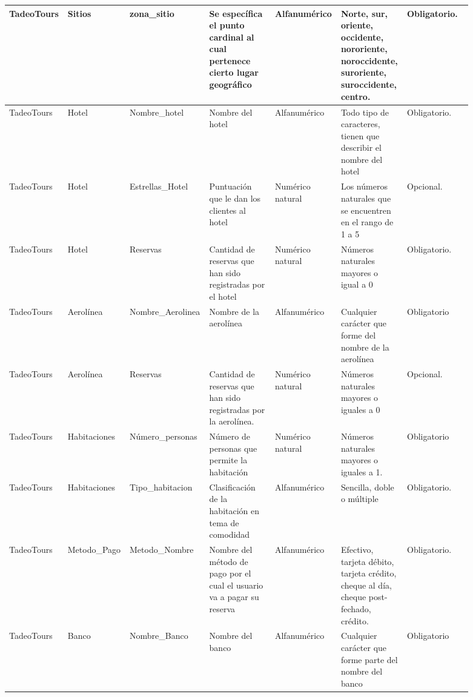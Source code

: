 \documentclass{article}
\begin{document}
\begin{landscape}
\begin{longtable}{|C{0.102\linewidth}|C{0.102\linewidth}|C{0.142\linewidth}|C{0.142\linewidth}|C{0.122\linewidth}|C{0.142\linewidth}|C{0.142\linewidth}|}
TadeoTours & Sitios & zona\_sitio & Se específica el punto cardinal al cual pertenece cierto lugar geográfico & Alfanumérico & Norte, sur, oriente, occidente, nororiente, noroccidente, suroriente, suroccidente, centro. & Obligatorio. \\ \hline

TadeoTours & Hotel & Nombre\_hotel & Nombre del hotel & Alfanumérico & Todo tipo de caracteres, tienen que describir el nombre del hotel & Obligatorio. \\ \hline

TadeoTours & Hotel & Estrellas\_Hotel & Puntuación que le dan los clientes al hotel & Numérico natural & Los números naturales que se encuentren en el rango de 1 a 5 & Opcional. \\ \hline

TadeoTours & Hotel & Reservas & Cantidad de reservas que han sido registradas por el hotel & Numérico natural & Números naturales mayores o igual a 0 & Obligatorio. \\ \hline

TadeoTours & Aerolínea & Nombre\_Aerolinea & Nombre de la aerolínea & Alfanumérico & Cualquier carácter que forme del nombre de la aerolínea & Obligatorio \\ \hline

TadeoTours & Aerolínea & Reservas & Cantidad de reservas que han sido registradas por la aerolínea. & Numérico natural & Números naturales mayores o iguales a 0 & Opcional. \\ \hline

TadeoTours & Habitaciones & Número\_personas & Número de personas que permite la habitación & Numérico natural & Números naturales mayores o iguales a 1. & Obligatorio \\ \hline

TadeoTours & Habitaciones & Tipo\_habitacion & Clasificación de la habitación en tema de comodidad & Alfanumérico & Sencilla, doble o múltiple & Obligatorio. \\ \hline

TadeoTours & Metodo\_Pago & Metodo\_Nombre & Nombre del método de pago por el cual el usuario va a pagar su reserva & Alfanumérico & Efectivo, tarjeta débito, tarjeta crédito, cheque al día, cheque post-fechado, crédito. & Obligatorio. \\ \hline

TadeoTours & Banco & Nombre\_Banco & Nombre del banco & Alfanumérico & Cualquier carácter que forme parte del nombre del banco & Obligatorio \\ \hline


\end{longtable}
\end{landscape}
\end{document}
